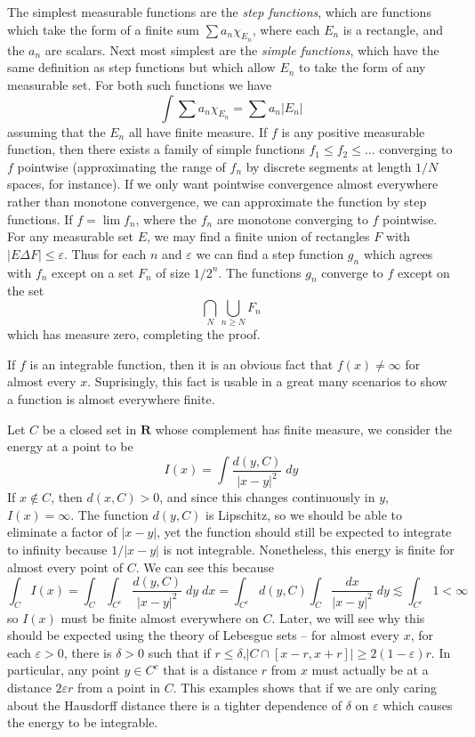 The simplest measurable functions are the {\it step functions}, which are functions which take the form of a finite sum $\sum a_n \chi_{E_n}$, where each $E_n$ is a rectangle, and the $a_n$ are scalars. Next most simplest are the {\it simple functions}, which have the same definition as step functions but which allow $E_n$ to take the form of any measurable set. For both such functions we have
%
\[ \int \sum a_n \chi_{E_n} = \sum a_n |E_n| \]
%
assuming that the $E_n$ all have finite measure. If $f$ is any positive measurable function, then there exists a family of simple functions $f_1 \leq f_2 \leq \dots$ converging to $f$ pointwise (approximating the range of $f_n$ by discrete segments at length $1/N$ spaces, for instance). If we only want pointwise convergence almost everywhere rather than monotone convergence, we can approximate the function by step functions. If $f = \lim f_n$, where the $f_n$ are monotone converging to $f$ pointwise. For any measurable set $E$, we may find a finite union of rectangles $F$ with $|E \Delta F| \leq \varepsilon$. Thus for each $n$ and $\varepsilon$ we can find a step function $g_n$ which agrees with $f_n$ except on a set $F_n$ of size $1/2^n$. The functions $g_n$ converge to $f$ except on the set
%
\[ \bigcap_N \bigcup_{n \geq N} F_n \]
%
which has measure zero, completing the proof.

If $f$ is an integrable function, then it is an obvious fact that $f(x) \neq \infty$ for almost every $x$. Suprisingly, this fact is usable in a great many scenarios to show a function is almost everywhere finite.

\begin{example}
  Let $C$ be a closed set in $\mathbf{R}$ whose complement has finite measure, we consider the energy at a point to be
  \[ I(x) = \int \frac{d(y,C)}{|x - y|^2}\; dy \]
  If $x \not \in C$, then $d(x,C) > 0$, and since this changes continuously in $y$, $I(x) = \infty$. The function $d(y,C)$ is Lipschitz, so we should be able to eliminate a factor of $|x - y|$, yet the function should still be expected to integrate to infinity because $1/|x-y|$ is not integrable. Nonetheless, this energy is finite for almost every point of $C$. We can see this because
  \[ \int_C I(x) = \int_C \int_{C^c} \frac{d(y,C)}{|x - y|^2}\; dy\; dx = \int_{C^c} d(y,C) \int_C \frac{dx}{|x - y|^2}\; dy \lesssim \int_{C^c} 1 < \infty \]
  so $I(x)$ must be finite almost everywhere on $C$. Later, we will see why this should be expected using the theory of Lebesgue sets -- for almost every $x$, for each $\varepsilon > 0$, there is $\delta > 0$ such that if $r \leq \delta$,$|C \cap [x-r,x+r]| \geq 2(1 - \varepsilon)r$. In particular, any point $y \in C^c$ that is a distance $r$ from $x$ must actually be at a distance $2 \varepsilon r$ from a point in $C$. This examples shows that if we are only caring about the Hausdorff distance there is a tighter dependence of $\delta$ on $\varepsilon$ which causes the energy to be integrable.
\end{example}

